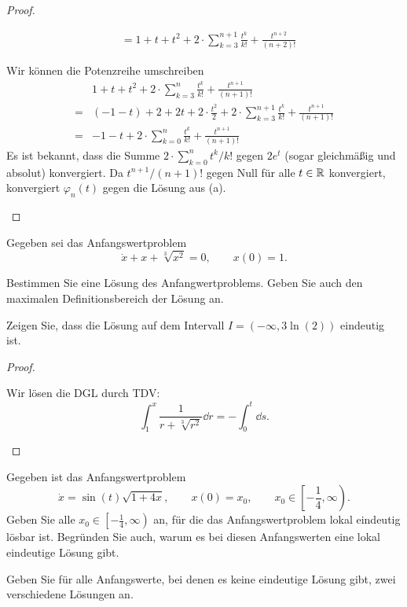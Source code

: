 \begin{proof}
\begin{parts}
\begin{align*}
			&=1+t+t^2 + 2\cdot \sum_{k=3}^{n+1}\frac{t^k}{k!}+\frac{t^{n+2}}{(n+2)!}
\end{align*}
\item Wir können die Potenzreihe umschreiben
	\begin{align*}
			&1+t+t^2 + 2\cdot \sum_{k=3}^{n}\frac{t^k}{k!}+\frac{t^{n+1}}{(n+1)!}\\
		=&(-1-t)+2+2t+2\cdot \frac{t^2}{2}+2\cdot \sum_{k=3}^{n+1}\frac{t^k}{k!}+\frac{t^{n+1}}{(n+1)!}\\
		=&-1-t+2\cdot \sum_{k=0}^n \frac{t^k}{k!}+\frac{t^{n+1}}{(n+1)!}
	\end{align*}
	Es ist bekannt, dass die Summe $2\cdot \sum_{k=0}^{n} t^k / k!$ gegen $2e^t$ (sogar gleichmäßig und absolut) konvergiert. Da $t^{n+1} / (n+1)!$ gegen Null f\"{u}r alle $t\in \mathbb{R}$ konvergiert, konvergiert $\varphi_n(t)$ gegen die L\"{o}sung aus (a).\qedhere
	\end{parts}
\end{proof}
\begin{Problem}
	Gegeben sei das Anfangswertproblem
	\[
		\dot{x}+x+\sqrt[3]{x^2} =0,\qquad x(0)=1
	.\] 
	\begin{parts}
	\item Bestimmen Sie eine L\"{o}sung des Anfangwertproblems. Geben Sie auch den maximalen Definitionsbereich der L\"{o}sung an.
	\item Zeigen Sie, dass die L\"{o}sung auf dem Intervall $I=(-\infty, 3\ln (2))$ eindeutig ist.
	\end{parts}
\end{Problem}
\begin{proof}
	\begin{parts}
	\item Wir l\"{o}sen die DGL durch TDV:
		\[
			\int_1^x \frac{1}{r+\sqrt[3]{r^2} }\dd{r}=-\int_0^t \dd{s}
		.\] 
	\end{parts}
\end{proof}
\begin{Problem}
	Gegeben ist das Anfangswertproblem
	\[
		\dot{x}=\sin(t)\sqrt{1+4x} ,\qquad x(0)=x_0,\qquad x_0\in \left[ -\frac{1}{4}, \infty\right)
	.\] 
	Geben Sie alle $x_0\in \left[-\frac{1}{4},\infty\right)$ an, f\"{u}r die das Anfangswertproblem lokal eindeutig l\"{o}sbar ist. Begr\"{u}nden Sie auch, warum es bei diesen Anfangswerten eine lokal eindeutige L\"{o}sung gibt.

	Geben Sie f\"{u}r alle Anfangswerte, bei denen es keine eindeutige L\"{o}sung gibt, zwei verschiedene L\"{o}sungen an.
\end{Problem}
